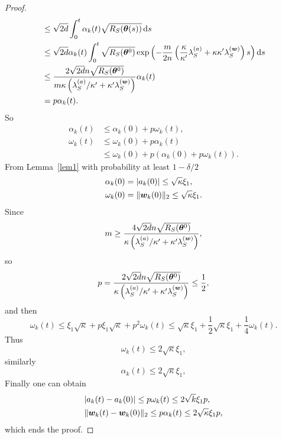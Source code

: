 \documentclass{article}
\begin{document}
\begin{proof}
\begin{equation}
\begin{aligned}
             & \leq \sqrt{2d} \int_{0}^t \alpha_k(t)\sqrt{R_S(\bm{\theta}(s))} \mathop{}\!\mathrm{d}{s}                                                                                                                  \\
             & \leq \sqrt{2d} \alpha_k(t) \int_{0}^{t} \sqrt{R_S(\bm{\theta}^0)}\exp\left(-\frac{m}{2n}\left(\frac{\kappa}{\kappa'}\lambda_S^{(a)}+\kappa\kappa'\lambda_S^{(\bm{w})}\right)s\right)\mathop{}\!\mathrm{d}{s} \\
             & \leq \frac{2\sqrt{2d}n\sqrt{R_S(\bm{\theta}^0)}}{m\kappa\left(\lambda^{(a)}_S/\kappa'+\kappa'\lambda_S^{(\bm{w})}\right)}\alpha_k(t)                                                         \\
             & = p\alpha_k(t).
        \end{aligned}
    \end{equation}
    So
    \begin{align}
        \alpha_k(t) & \leq \alpha_k(0) + p\omega_k(t),                  \\
        \omega_k(t)
                    & \leq \omega_k(0) + p\alpha_k(t)                   \\
                    & \leq \omega_k(0) + p(\alpha_k(0) + p\omega_k(t)).
    \end{align}
    From Lemma~\ref{lem1} with probability at least $1 - \delta/2$
    \begin{align}
        \alpha_k(0) & = \lvert a_k(0)\rvert \leq \sqrt{\kappa}\xi_1,      \\
        \omega_k(0) & = \lVert\bm{w}_k(0)\rVert_2 \leq \sqrt{\kappa}\xi_1.
    \end{align}
    Since
    \begin{equation}
        m \geq \frac{4\sqrt{2d}n\sqrt{R_S(\bm{\theta}^0)}}{\kappa\left(\lambda_S^{(a)}/\kappa'+\kappa'\lambda_S^{(\bm{w})}\right)},
    \end{equation}
    so
    \begin{equation}
        p=\frac{2\sqrt{2d}n\sqrt{R_S(\bm{\theta}^0)}}{\kappa\left(\lambda_S^{(a)}/\kappa'+\kappa'\lambda_S^{(\bm{w})}\right)}\leq \frac{1}{2},
    \end{equation}
    and then
    \begin{equation}
        \omega_k(t)\leq \xi_1 \sqrt{\kappa} + p\xi_1\sqrt{\kappa} + p^2\omega_k(t) \leq \sqrt{\kappa}\xi_1+\frac{1}{2}\sqrt{\kappa}\xi_1+\frac{1}{4}\omega_k(t).
    \end{equation}
    Thus
    \begin{equation}
        \omega_k(t)\leq 2\sqrt{\kappa}\xi_1,
    \end{equation}
    similarly
    \begin{equation}
        \alpha_k(t)\leq 2\sqrt{\kappa}\xi_1,
    \end{equation}
    Finally one can obtain
    \begin{align}
         & |a_k(t)-a_k(0)|\leq p\omega_k(t)\leq 2\sqrt{k}\xi_1 p,                 \\
         & \lVert\bm{w}_k(t)-\bm{w}_k(0)\rVert_2\leq p\alpha_k(t)\leq 2\sqrt{\kappa}\xi_1 p,
    \end{align}
    which ends the proof.
\end{proof}
\end{document}
